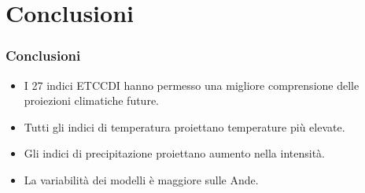 \section{Conclusioni}

\begin{frame}
	\frametitle{Conclusioni}
	\begin{itemize}
		\setlength\itemsep{10pt}
		\item<1-> I 27 indici ETCCDI hanno permesso una migliore comprensione delle proiezioni climatiche future.
		\item<2-> Tutti gli indici di temperatura proiettano temperature più elevate.
		\item<3-> Gli indici di precipitazione proiettano aumento nella intensità.
		\item<4-> La variabilità dei modelli è maggiore sulle Ande.
    \end{itemize}    
\end{frame}	

